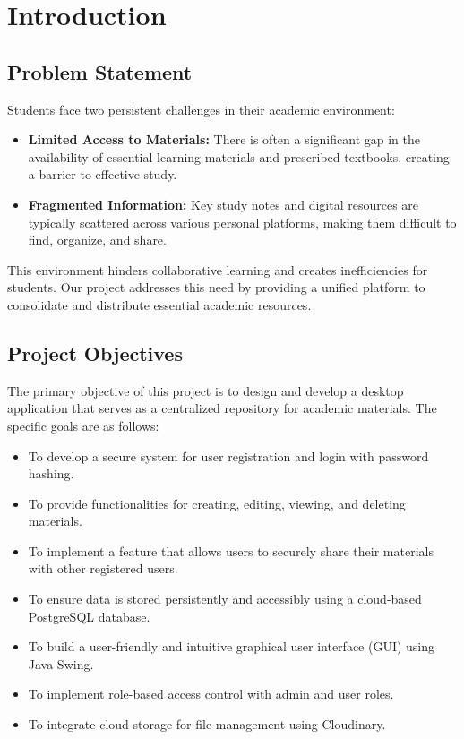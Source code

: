 \documentclass[12pt, a4paper]{report}
\begin{document}

\chapter{Introduction}

\section{Problem Statement}
Students face two persistent challenges in their academic environment:
\begin{itemize}
    \item \textbf{Limited Access to Materials:} There is often a significant gap in the availability of essential learning materials and prescribed textbooks, creating a barrier to effective study.
    \item \textbf{Fragmented Information:} Key study notes and digital resources are typically scattered across various personal platforms, making them difficult to find, organize, and share.
\end{itemize}
This environment hinders collaborative learning and creates inefficiencies for students. Our project addresses this need by providing a unified platform to consolidate and distribute essential academic resources.

\section{Project Objectives}
The primary objective of this project is to design and develop a desktop application that serves as a centralized repository for academic materials. The specific goals are as follows:
\begin{itemize}
    \item To develop a secure system for user registration and login with password hashing.
    \item To provide functionalities for creating, editing, viewing, and deleting materials.
    \item To implement a feature that allows users to securely share their materials with other registered users.
    \item To ensure data is stored persistently and accessibly using a cloud-based PostgreSQL database.
    \item To build a user-friendly and intuitive graphical user interface (GUI) using Java Swing.
    \item To implement role-based access control with admin and user roles.
    \item To integrate cloud storage for file management using Cloudinary.
\end{itemize}
\end{document}
